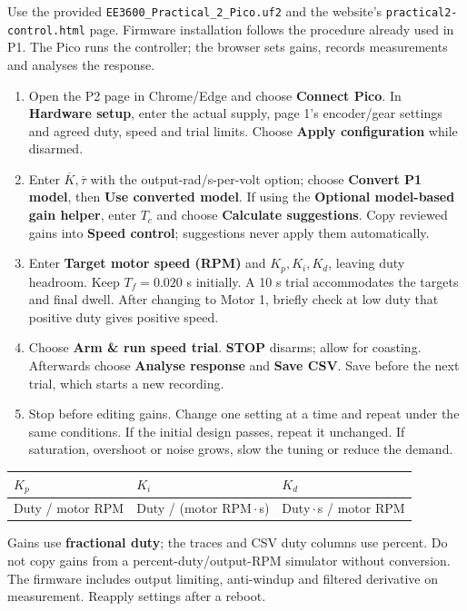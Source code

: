 \documentclass[11pt,a4paper]{article}
\newcommand{\sect}[1]{\vspace{3pt}\noindent{\large\bfseries #1}\par\vspace{2pt}}
\newcommand{\ui}[1]{\textbf{#1}}
\begin{document}
\newpage
\sect{6. Implement and Test Speed Control}
Use the provided \texttt{EE3600\_Practical\_2\_Pico.uf2} and the website's \texttt{practical2-control.html} page. Firmware installation follows the procedure already used in P1. The Pico runs the controller; the browser sets gains, records measurements and analyses the response.
\begin{enumerate}
\item Open the P2 page in Chrome/Edge and choose \ui{Connect Pico}. In \ui{Hardware setup}, enter the actual supply, page 1's encoder/gear settings and agreed duty, speed and trial limits. Choose \ui{Apply configuration} while disarmed.
\item Enter $\overline K,\overline\tau$ with the output-rad/s-per-volt option; choose \ui{Convert P1 model}, then \ui{Use converted model}. If using the \ui{Optional model-based gain helper}, enter $T_c$ and choose \ui{Calculate suggestions}. Copy reviewed gains into \ui{Speed control}; suggestions never apply them automatically.
\item Enter \ui{Target motor speed (RPM)} and $K_p,K_i,K_d$, leaving duty headroom. Keep $T_f=0.020$ s initially. A 10 s trial accommodates the targets and final dwell. After changing to Motor 1, briefly check at low duty that positive duty gives positive speed.
\item Choose \ui{Arm \& run speed trial}. \ui{STOP} disarms; allow for coasting. Afterwards choose \ui{Analyse response} and \ui{Save CSV}. Save before the next trial, which starts a new recording.
\item Stop before editing gains. Change one setting at a time and repeat under the same conditions. If the initial design passes, repeat it unchanged. If saturation, overshoot or noise grows, slow the tuning or reduce the demand.
\end{enumerate}
\begin{center}\small
\begin{tabular}{@{}lll@{}}
\toprule
$K_p$ & $K_i$ & $K_d$\\
\midrule
Duty / motor RPM & Duty / (motor RPM\,$\cdot$\,s) & Duty\,$\cdot$\,s / motor RPM\\
\bottomrule
\end{tabular}
\end{center}
Gains use \textbf{fractional duty}; the traces and CSV duty columns use percent. Do not copy gains from a percent-duty/output-RPM simulator without conversion. The firmware includes output limiting, anti-windup and filtered derivative on measurement. Reapply settings after a reboot.
\end{document}
